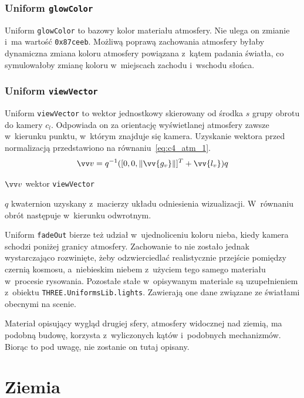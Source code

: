 \subsubsection{Uniform \texttt{glowColor}}
Uniform \texttt{glowColor} to bazowy kolor materiału atmosfery. Nie ulega on zmianie i~ma wartość \texttt{0x87ceeb}. Możliwą poprawą zachowania atmosfery byłaby dynamiczna zmiana koloru atmosfery powiązana z~kątem padania światła, co symulowałoby zmianę koloru w~miejscach zachodu i~wschodu słońca.

\subsubsection{Uniform \texttt{viewVector}}
Uniform \texttt{viewVector} to wektor jednostkowy skierowany od środka $s$ grupy obrotu do kamery $c_l$. Odpowiada on za orientację wyświetlanej atmosfery zawsze w~kierunku punktu, w~którym znajduje się kamera. Uzyskanie wektora przed normalizacją przedstawiono na równaniu~\ref{eq:c4_atm_1}.
\begin{equation}
  \label{eq:c4_atm_1}
  \vv v = q^{-1}([0, 0, \length{\vv{g_v}}]^T + \vv{l_v})q
\end{equation}
\begin{eqexpl}[25mm]
\item {$\vv v$} wektor \texttt{viewVector}
\item {$q$} kwaternion uzyskany z~macierzy układu odniesienia wizualizacji. W~równaniu obrót następuje w~kierunku odwrotnym.
\end{eqexpl}
\vspace{\baselineskip}


Uniform \texttt{fadeOut} bierze też udział w~ujednoliceniu koloru nieba, kiedy kamera schodzi poniżej granicy atmosfery. Zachowanie to nie zostało jednak wystarczająco rozwinięte, żeby odzwierciedlać realistycznie przejście pomiędzy czernią kosmosu, a~niebieskim niebem z~użyciem tego samego materiału w~procesie rysowania. Pozostałe stałe w~opisywanym materiale są uzupełnieniem z~obiektu \mbox{\texttt{THREE.UniformsLib.lights}}. Zawierają one dane związane ze światłami obecnymi na scenie. 

Materiał opisujący wygląd drugiej sfery, atmosfery widocznej nad ziemią, ma podobną budowę, korzysta z~wyliczonych kątów i~podobnych mechanizmów. Biorąc to pod uwagę, nie zostanie on tutaj opisany. 

\section{Ziemia}

